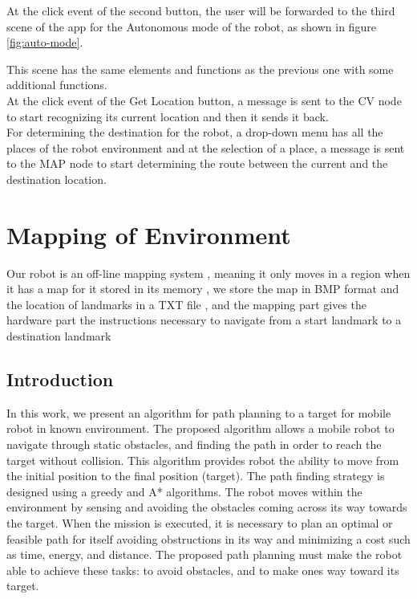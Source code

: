 \documentclass[12pt]{article}
\newcommand\blankpage{%
	\null
	\thispagestyle{empty}%
	\addtocounter{page}{-1}%
	\newpage}
\begin{document}
\noindent At the click event of the second button, the user will be forwarded to the third scene of the app for the
Autonomous mode of the robot, as shown in figure \ref{fig:auto-mode}.

This scene has the same elements and functions as the previous one with some additional functions.\\

\noindent At the click event of the Get Location button, a message is sent to the CV node to start recognizing its current location and then it sends it back.\\

\noindent For determining the destination for the robot, a drop-down menu has all the places of the robot environment and at the selection of a place, a message is sent to the MAP node to start determining the route between the current and the destination location.









\afterpage{\blankpage}
\newpage

\section{Mapping of Environment}
Our robot is an off-line mapping system , meaning it only moves in a region when it has a map for it stored in its memory , we store the map in BMP format and the location of landmarks in a TXT file , and the mapping part gives the hardware part the instructions necessary to navigate from a start landmark to a destination landmark

\subsection{Introduction}
In this work, we present an algorithm for path planning to a target for mobile robot in known environment. The proposed algorithm allows a mobile robot to navigate through static obstacles, and finding the path in order to reach the target without collision. This algorithm provides robot the ability to move from the initial position to the final position (target). The path finding strategy is designed using a greedy and A* algorithms. The robot moves within the environment by sensing and avoiding the obstacles coming across its way towards the target. When the mission is executed, it is necessary to plan an optimal or feasible path for itself avoiding obstructions in its way and minimizing a cost such as time, energy, and distance. The proposed path planning must make the robot able to achieve these tasks: to avoid obstacles, and to make ones way toward its target. 
\end{document}
